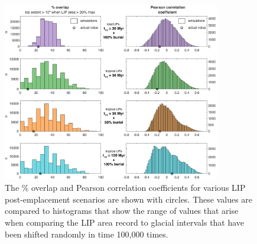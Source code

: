 \documentclass[11pt,letterpaper]{article}
\begin{document}
\begin{figure}[h!]
\begin{center}
	\includegraphics[width=0.85\textwidth]{Manuscript/Figures/overlap_correlation_cropped.pdf}
	\caption{The \% overlap and Pearson correlation coefficients for various LIP post-emplacement scenarios are shown with circles. These values are compared to histograms that show the range of values that arise when comparing the LIP area record to glacial intervals that have been shifted randomly in time 100,000 times.}
	\label{fig:LIP_correlation}
\end{center}
\end{figure}

\clearpage
\newpage
\footnotesize

\singlespacing



\end{document}
